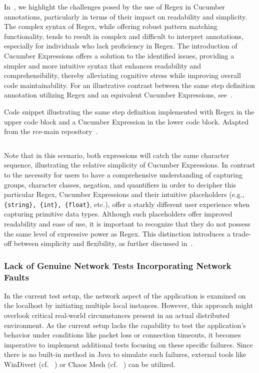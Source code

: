 In~, we highlight the challenges posed by the use of \ac{Regex} in Cucumber annotations, particularly in terms of their impact on readability and simplicity. The complex syntax of \ac{Regex}, while offering robust pattern matching functionality, tends to result in complex and difficult to interpret annotations, especially for individuals who lack proficiency in \ac{Regex}. The introduction of Cucumber Expressions offers a solution to the identified issues, providing a simpler and more intuitive syntax that enhances readability and comprehensibility, thereby alleviating cognitive stress while improving overall code maintainability. For an illustrative contrast between the same step definition annotation utilizing \ac{Regex} and an equivalent Cucumber Expressions, see~.

\begin{listing}[!ht]
\caption{Code snippet illustrating the same step definition implemented with \ac{Regex} in the upper code block and a Cucumber Expression in the lower code block. Adapted from the rce-main repository~\cite{githubGitHubRcenvironmentrcemain}.}
\label{lst:simpleRegex}
\inputminted{java}{files/code/simpleRegex.java}
\end{listing}

Note that in this scenario, both expressions will catch the same character sequence, illustrating the relative simplicity of Cucumber Expressions. In contrast to the necessity for users to have a comprehensive understanding of capturing groups, character classes, negation, and quantifiers in order to decipher this particular \ac{Regex}, Cucumber Expressions and their intuitive placeholders (e.g., \verb|{string}, {int}, {float}|, etc.), offer a starkly different user experience when capturing primitive data types. Although such placeholders offer improved readability and ease of use, it is important to recognize that they do not possess the same level of expressive power as \ac{Regex}. This distinction introduces a trade-off between simplicity and flexibility, as further discussed in~. 


\subsubsection{Lack of Genuine Network Tests Incorporating Network Faults}
\label{sub:lack-network-tests}

In the current test setup, the network aspect of the application is examined on the localhost by initiating multiple local instances. However, this approach might overlook critical real-world circumstances present in an actual distributed environment. As the current setup lacks the capability to test the application's behavior under conditions like packet loss or connection timeouts, it becomes imperative to implement additional tests focusing on these specific failures. Since there is no built-in method in Java to simulate such failures, external tools like WinDivert (cf. ~) or Chaos Mesh (cf. ~) can be utilized.

